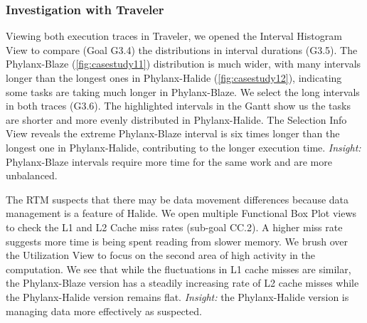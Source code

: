\begin{refsection}


\subsubsection{Investigation with Traveler}
\label{subsubsec:investigation}
Viewing both execution traces in Traveler, we opened the Interval Histogram View to compare (Goal G3.4) the distributions in interval durations (G3.5). The Phylanx-Blaze (\autoref{fig:casestudy11}) distribution is much wider, with many intervals longer than the longest ones in Phylanx-Halide (\autoref{fig:casestudy12}), indicating some tasks are taking much longer in Phylanx-Blaze. We select the long intervals in both traces (G3.6). The highlighted intervals in the Gantt show us the tasks are shorter and more evenly distributed in Phylanx-Halide. The Selection Info View reveals the extreme Phylanx-Blaze interval is six times longer than the longest one in Phylanx-Halide, contributing to the longer execution time. {\em Insight:} Phylanx-Blaze intervals require more time for the same work and are more unbalanced.

The RTM suspects that there may be data movement differences because data management is a feature of Halide. We open multiple Functional Box Plot views to check the L1 and L2 Cache miss rates (sub-goal CC.2). A higher miss rate suggests more time is being spent reading from slower memory. We brush over the Utilization View to focus on the second area of high activity in the computation. We see that while the fluctuations in L1 cache misses are similar, the Phylanx-Blaze version has a steadily increasing rate of L2 cache misses while the Phylanx-Halide version remains flat. {\em Insight:} the Phylanx-Halide version is managing data more effectively as suspected.


\end{refsection}

